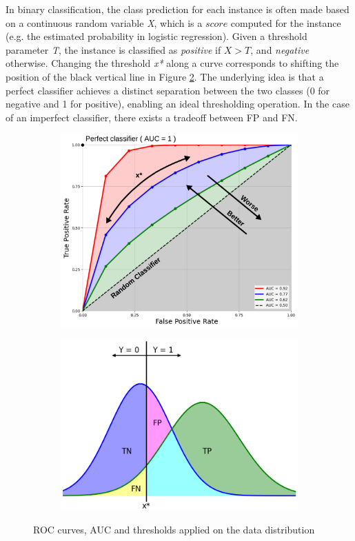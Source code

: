 In binary classification, the class prediction for each instance is often made based on a continuous random variable \textit{X}, which is a $score$ computed for the instance (e.g. the estimated probability in logistic regression). 
Given a threshold parameter \textit{T}, the instance is classified as \textit{positive} if $X > T$, and \textit{negative} otherwise. 
Changing the threshold \textit{x*} along a curve corresponds to shifting the position of the black vertical line in Figure \ref{fig:PNDistribution}. 
The underlying idea is that a perfect classifier achieves a distinct separation between the two classes (0 for negative and 1 for positive), enabling an ideal thresholding operation.
In the case of an imperfect classifier, there exists a tradeoff between FP and FN.
\begin{figure}[H]
  \centering
  \begin{subfigure}{0.73\linewidth}
    \includegraphics[width=\linewidth]{graphics/ROC_AUC.png}
    \caption{}
    \label{fig:ROC_AUC}
  \end{subfigure}
  \begin{subfigure}{0.65\linewidth}
    \includegraphics[width=\linewidth]{graphics/PN_Distribution_Thresholded.png}
    \caption{}
    \label{fig:PNDistribution}
  \end{subfigure}
  \caption{ROC curves, AUC and thresholds applied on the data distribution}
  \label{fig:ROC}
\end{figure}